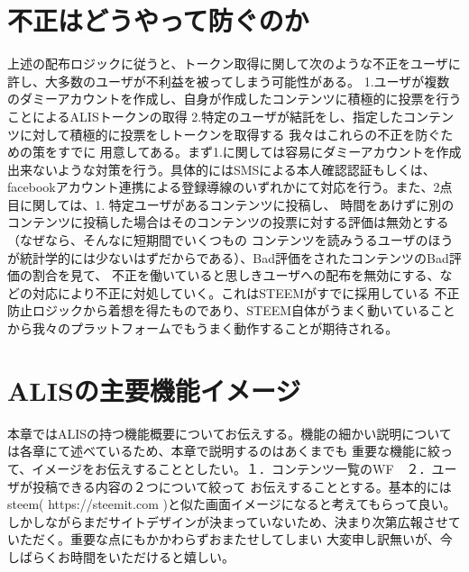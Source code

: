 \documentclass{jsarticle}
\begin{document}
\section{不正はどうやって防ぐのか}
上述の配布ロジックに従うと、トークン取得に関して次のような不正をユーザに許し、大多数のユーザが不利益を被ってしまう可能性がある。
1.ユーザが複数のダミーアカウントを作成し、自身が作成したコンテンツに積極的に投票を行うことによるALISトークンの取得
2.特定のユーザが結託をし、指定したコンテンツに対して積極的に投票をしトークンを取得する
我々はこれらの不正を防ぐための策をすでに
用意してある。まず1.に関しては容易にダミーアカウントを作成出来ないような対策を行う。具体的にはSMSによる本人確認認証もしくは、
facebookアカウント連携による登録導線のいずれかにて対応を行う。また、2点目に関しては、1. 特定ユーザがあるコンテンツに投稿し、
時間をあけずに別のコンテンツに投稿した場合はそのコンテンツの投票に対する評価は無効とする（なぜなら、そんなに短期間でいくつもの
コンテンツを読みうるユーザのほうが統計学的には少ないはずだからである）、Bad評価をされたコンテンツのBad評価の割合を見て、
不正を働いていると思しきユーザへの配布を無効にする、などの対応により不正に対処していく。これはSTEEMがすでに採用している
不正防止ロジックから着想を得たものであり、STEEM自体がうまく動いていることから我々のプラットフォームでもうまく動作することが期待される。
\section{ALISの主要機能イメージ}
本章ではALISの持つ機能概要についてお伝えする。機能の細かい説明については各章にて述べているため、本章で説明するのはあくまでも
重要な機能に絞って、イメージをお伝えすることとしたい。１．コンテンツ一覧のWF　２．ユーザが投稿できる内容の２つについて絞って
お伝えすることとする。基本的にはsteem( https://steemit.com )と似た画面イメージになると考えてもらって良い。
しかしながらまだサイトデザインが決まっていないため、決まり次第広報させていただく。重要な点にもかかわらずおまたせしてしまい
大変申し訳無いが、今しばらくお時間をいただけると嬉しい。
\end{document}
